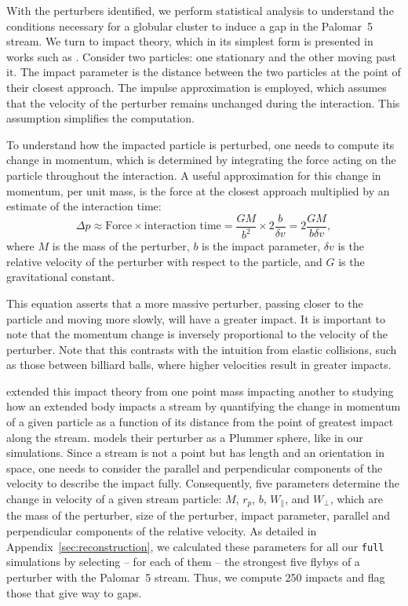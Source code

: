\documentclass{aa}
\begin{document}
    With the perturbers identified, we perform statistical analysis to understand the conditions necessary for a globular cluster to induce a gap in the Palomar~5 stream. We turn to impact theory, which in its simplest form is presented in works such as \citet{2008gady.book.....B}. Consider two particles: one stationary and the other moving past it. The impact parameter is the distance between the two particles at the point of their closest approach. The impulse approximation is employed, which assumes that the velocity of the perturber remains unchanged during the interaction. This assumption simplifies the computation.

    To understand how the impacted particle is perturbed, one needs to compute its change in momentum, which is determined by integrating the force acting on the particle throughout the interaction. A useful approximation for this change in momentum, per unit mass, is the force at the closest approach multiplied by an estimate of the interaction time:
    \begin{equation} \label{eq:change_in_momentum} \Delta p \approx \text{Force} \times \text{interaction time} = \frac{GM}{b^2} \times 2\frac{b}{\delta v} = 2\frac{GM}{b \delta v}, \end{equation}where $M$ is the mass of the perturber, $b$ is the impact parameter, $\delta v$ is the relative velocity of the perturber with respect to the particle, and $G$ is the gravitational constant. 


    This equation asserts that a more massive perturber, passing closer to the particle and moving more slowly, will have a greater impact. It is important to note that the momentum change is inversely proportional to the velocity of the perturber. Note that this contrasts with the intuition from elastic collisions, such as those between billiard balls, where higher velocities result in greater impacts.

    \citet{2015MNRAS.450.1136E} extended this impact theory from one point mass impacting another to studying how an extended body impacts a stream by quantifying the change in momentum of a given particle as a function of its distance from the point of greatest impact along the stream. \citet{2015MNRAS.450.1136E} models their perturber as a Plummer sphere, like in our simulations. Since a stream is not a point but has length and an orientation in space, one needs to consider the parallel and perpendicular components of the velocity to describe the impact fully. Consequently, five parameters determine the change in velocity of a given stream particle: $M$, $r_p$, $b$, $W_\parallel$, and $W_\perp$, which are the mass of the perturber, size of the perturber, impact parameter, parallel and perpendicular components of the relative velocity. As detailed in Appendix~\ref{sec:reconstruction}, we calculated these parameters for all our \texttt{full} simulations by selecting -- for each of them --  the strongest five flybys of a perturber with the Palomar~5 stream. Thus, we compute 250 impacts and flag those that give way to gaps. 
\end{document}
